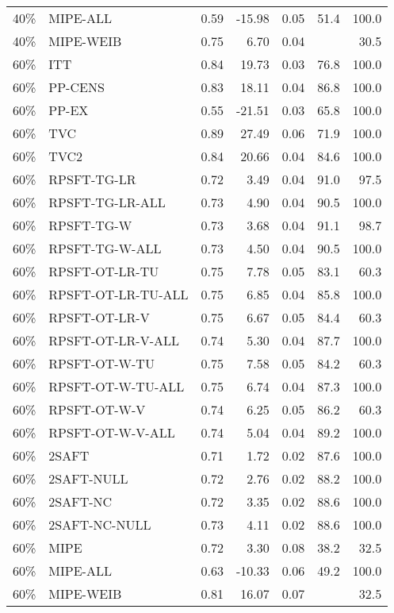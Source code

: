 \begin{table}[ht]
{\begin{tabular}{llrrrrr}
  40\% & MIPE-ALL & 0.59 & -15.98 & 0.05 & 51.4 & 100.0 \\ 
  40\% & MIPE-WEIB & 0.75 & 6.70 & 0.04 &  & 30.5 \\ 
   \hline
60\% & ITT & 0.84 & 19.73 & 0.03 & 76.8 & 100.0 \\ 
  60\% & PP-CENS & 0.83 & 18.11 & 0.04 & 86.8 & 100.0 \\ 
  60\% & PP-EX & 0.55 & -21.51 & 0.03 & 65.8 & 100.0 \\ 
  60\% & TVC & 0.89 & 27.49 & 0.06 & 71.9 & 100.0 \\ 
  60\% & TVC2 & 0.84 & 20.66 & 0.04 & 84.6 & 100.0 \\ 
   \hline
60\% & RPSFT-TG-LR & 0.72 & 3.49 & 0.04 & 91.0 & 97.5 \\ 
  60\% & RPSFT-TG-LR-ALL & 0.73 & 4.90 & 0.04 & 90.5 & 100.0 \\ 
  60\% & RPSFT-TG-W & 0.73 & 3.68 & 0.04 & 91.1 & 98.7 \\ 
  60\% & RPSFT-TG-W-ALL & 0.73 & 4.50 & 0.04 & 90.5 & 100.0 \\ 
  60\% & RPSFT-OT-LR-TU & 0.75 & 7.78 & 0.05 & 83.1 & 60.3 \\ 
  60\% & RPSFT-OT-LR-TU-ALL & 0.75 & 6.85 & 0.04 & 85.8 & 100.0 \\ 
  60\% & RPSFT-OT-LR-V & 0.75 & 6.67 & 0.05 & 84.4 & 60.3 \\ 
  60\% & RPSFT-OT-LR-V-ALL & 0.74 & 5.30 & 0.04 & 87.7 & 100.0 \\ 
   \hline
60\% & RPSFT-OT-W-TU & 0.75 & 7.58 & 0.05 & 84.2 & 60.3 \\ 
  60\% & RPSFT-OT-W-TU-ALL & 0.75 & 6.74 & 0.04 & 87.3 & 100.0 \\ 
  60\% & RPSFT-OT-W-V & 0.74 & 6.25 & 0.05 & 86.2 & 60.3 \\ 
  60\% & RPSFT-OT-W-V-ALL & 0.74 & 5.04 & 0.04 & 89.2 & 100.0 \\ 
   \hline
60\% & 2SAFT & 0.71 & 1.72 & 0.02 & 87.6 & 100.0 \\ 
  60\% & 2SAFT-NULL & 0.72 & 2.76 & 0.02 & 88.2 & 100.0 \\ 
  60\% & 2SAFT-NC & 0.72 & 3.35 & 0.02 & 88.6 & 100.0 \\ 
  60\% & 2SAFT-NC-NULL & 0.73 & 4.11 & 0.02 & 88.6 & 100.0 \\ 
  60\% & MIPE & 0.72 & 3.30 & 0.08 & 38.2 & 32.5 \\ 
  60\% & MIPE-ALL & 0.63 & -10.33 & 0.06 & 49.2 & 100.0 \\ 
  60\% & MIPE-WEIB & 0.81 & 16.07 & 0.07 &  & 32.5 \\ 
   \hline
\end{tabular}
}
\end{table}
